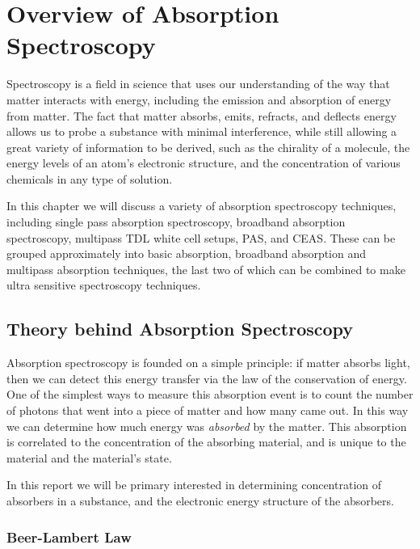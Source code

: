 \chapter{Overview of Absorption Spectroscopy}\label{ch:overview}

Spectroscopy is a field in science that uses our understanding of the way
that matter interacts with energy, including the emission and absorption
of energy from matter. The fact that matter absorbs, emits, refracts, and
deflects energy allows us to probe a substance with minimal interference,
while still allowing a great variety of information to be derived, such as
the chirality of a molecule, the energy levels of an atom's
electronic structure, and the concentration of various chemicals in any type of solution.



In this chapter we will discuss a variety of absorption spectroscopy
techniques, including single pass absorption spectroscopy, broadband
absorption spectroscopy, multipass \ac{TDL} white cell setups, \ac{PAS},
and \ac{CEAS}. These can be grouped approximately into basic
absorption, broadband absorption and multipass absorption techniques, the last
two of which can be combined to make ultra sensitive spectroscopy techniques.


\section{Theory behind Absorption Spectroscopy}\label{sec:theory}

Absorption spectroscopy is founded on a simple principle: if matter absorbs
light, then we can detect this energy transfer via the law of the conservation
of energy. One of the simplest ways to measure this absorption event is to
count the number of photons that went into a piece of matter and how many
came out. In this way we can determine how much energy was \emph{absorbed}
by the matter. This absorption is correlated to the concentration of the
absorbing material, and is unique to the material and the material's state.

In this report we will be primary interested in determining concentration
of absorbers in a substance, and the electronic energy structure of the
absorbers.

\subsection{Beer-Lambert Law}\label{subsec:beer}

